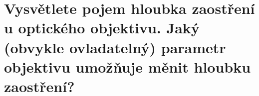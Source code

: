 \section{Vysvětlete pojem hloubka zaostření u optického objektivu. Jaký (obvykle ovladatelný) parametr objektivu 
umožňuje měnit hloubku zaostření?}